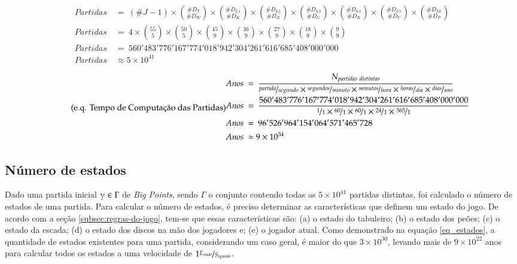  \begin{equation}
	 \label{eq_partidas}
	 \tag{e.q. Números de Partidas Distintas}
 \begin{split}
 Partidas\ &=\  (\#J-1) \times \binom{\#D_T}{\#D_W} \times \binom{\#D_{L1}}{\#D_K} \times \binom{\#D_{L2}}{\#D_R} \times \binom{\#D_{L3}}{\#D_G} \times \binom{\#D_{L4}}{\#D_B} \times \binom{\#D_{L5}}{\#D_Y} \times \binom{\#D_{L6}}{\#D_P}\\
 Partidas\ &=\  4\times \binom{55}{5} \times \binom{50}{5} \times \binom{45}{9} \times \binom{36}{9} \times \binom{27}{9} \times \binom{18}{9} \times \binom{9}{9}\\
 Partidas\ &=\ 560'483'776'167'774'018'942'304'261'616'685'408'000'000\\
 Partidas\ &\approx 5\times 10^{41}
 \end{split}
 \end{equation}

 \begin{equation} \label{eq_anos_partidas} \tag{e.q. Tempo de Computação das Partidas}
 \begin{split}
 Anos\ &=\ \dfrac{N_{partidas\ distintas}}{\nicefrac{partida}{segundo}\times\nicefrac{segundos}{minuto}\times\nicefrac{minutos}{hora}\times\nicefrac{horas}{dia}\times\nicefrac{dias}{ano}}\\
 Anos\ &=\ \dfrac{560'483'776'167'774'018'942'304'261'616'685'408'000'000}{\nicefrac{1}{1}\times\nicefrac{60}{1}\times\nicefrac{60}{1}\times\nicefrac{24}{1}\times\nicefrac{365}{1}}\\
 Anos\ &=\ 96'526'964'154'064'571'465'728\\
 Anos\ &\approx 9\times 10^{34}
 \end{split}
 \end{equation}

\subsection{Número de estados}

Dado uma partida inicial $\gammaup \in \Gamma$ de \emph{Big Points}, sendo $\Gamma$ o conjunto contendo todas as $5\times 10^{41}$ partidas distintas, foi calculado o número de estados de uma partida. Para calcular o número de estados, é preciso determinar as características que definem um estado do jogo. De acordo com a seção \ref{subsec:regras-do-jogo}, tem-se que essas características são: (a) o estado do tabuleiro; (b) o estado dos peões; (c) o estado da escada; (d) o estado dos discos na mão dos jogadores e; (e) o jogador atual. Como demonstrado na equação \ref{eq_estados}, a quantidade de estados existentes para uma partida, considerando um caso geral, é maior do que $3\times 10^{30}$, levando mais de $9\times 10^{22}$ anos para calcular todos os estados a uma velocidade de $1 \nicefrac{E_{stado}}{S_{egundo}}$.

